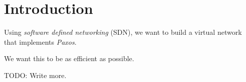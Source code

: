 \chapter{Introduction}

Using {\em software defined networking} (\ac{SDN}), we want to build a virtual network that implements
{\em Paxos}\cite{Lamport:1998:PP:279227.279229}.

We want this to be as efficient as possible.

TODO: Write more.

